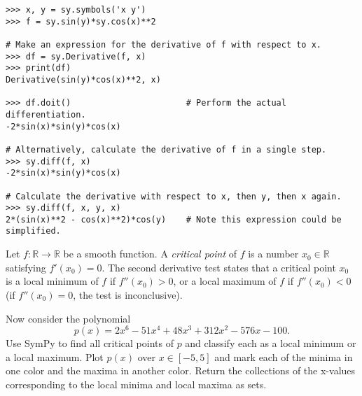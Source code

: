 \begin{lstlisting}
>>> x, y = sy.symbols('x y')
>>> f = sy.sin(y)*sy.cos(x)**2

# Make an expression for the derivative of f with respect to x.
>>> df = sy.Derivative(f, x)
>>> print(df)
Derivative(sin(y)*cos(x)**2, x)

>>> df.doit()                       # Perform the actual differentiation.
-2*sin(x)*sin(y)*cos(x)

# Alternatively, calculate the derivative of f in a single step.
>>> sy.diff(f, x)
-2*sin(x)*sin(y)*cos(x)

# Calculate the derivative with respect to x, then y, then x again.
>>> sy.diff(f, x, y, x)
2*(sin(x)**2 - cos(x)**2)*cos(y)    # Note this expression could be simplified.
\end{lstlisting}

\begin{problem} %
Let $f:\mathbb{R}\rightarrow\mathbb{R}$ be a smooth function.
A \emph{critical point} of $f$ is a number $x_0\in\mathbb{R}$ satisfying $f'(x_0) = 0$.
The second derivative test states that a critical point $x_0$ is a local minimum of $f$ if $f''(x_0) > 0$, or a local maximum of $f$ if $f''(x_0) < 0$ (if $f''(x_0) = 0$, the test is inconclusive).

Now consider the polynomial
\[
p(x) = 2x^6 - 51x^4 + 48x^3 + 312x^2 - 576x - 100.
\]
Use SymPy to find all critical points of $p$ and classify each as a local minimum or a local maximum.
Plot $p(x)$ over $x\in[-5,5]$ and mark each of the minima in one color and the maxima in another color.
Return the collections of the x-values corresponding to the local minima and local maxima as sets.
\end{problem}

